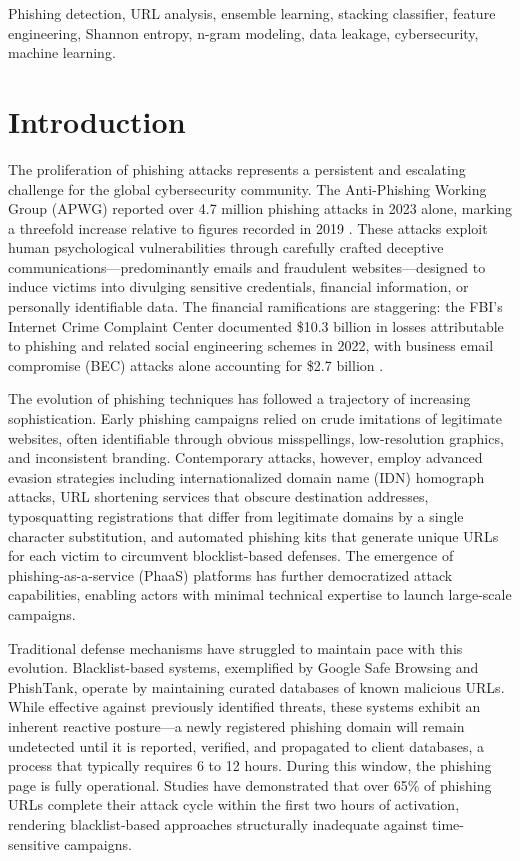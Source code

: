 \documentclass[conference]{IEEEtran}
\begin{document}
\begin{IEEEkeywords}
Phishing detection, URL analysis, ensemble learning, stacking classifier, feature engineering, Shannon entropy, n-gram modeling, data leakage, cybersecurity, machine learning.
\end{IEEEkeywords}

\section{Introduction}
The proliferation of phishing attacks represents a persistent and escalating challenge for the global cybersecurity community. The Anti-Phishing Working Group (APWG) reported over 4.7 million phishing attacks in 2023 alone, marking a threefold increase relative to figures recorded in 2019 \cite{apwg}. These attacks exploit human psychological vulnerabilities through carefully crafted deceptive communications---predominantly emails and fraudulent websites---designed to induce victims into divulging sensitive credentials, financial information, or personally identifiable data. The financial ramifications are staggering: the FBI's Internet Crime Complaint Center documented \$10.3 billion in losses attributable to phishing and related social engineering schemes in 2022, with business email compromise (BEC) attacks alone accounting for \$2.7 billion \cite{fbi}.

The evolution of phishing techniques has followed a trajectory of increasing sophistication. Early phishing campaigns relied on crude imitations of legitimate websites, often identifiable through obvious misspellings, low-resolution graphics, and inconsistent branding. Contemporary attacks, however, employ advanced evasion strategies including internationalized domain name (IDN) homograph attacks, URL shortening services that obscure destination addresses, typosquatting registrations that differ from legitimate domains by a single character substitution, and automated phishing kits that generate unique URLs for each victim to circumvent blocklist-based defenses. The emergence of phishing-as-a-service (PhaaS) platforms has further democratized attack capabilities, enabling actors with minimal technical expertise to launch large-scale campaigns.

Traditional defense mechanisms have struggled to maintain pace with this evolution. Blacklist-based systems, exemplified by Google Safe Browsing and PhishTank, operate by maintaining curated databases of known malicious URLs. While effective against previously identified threats, these systems exhibit an inherent reactive posture---a newly registered phishing domain will remain undetected until it is reported, verified, and propagated to client databases, a process that typically requires 6 to 12 hours. During this window, the phishing page is fully operational. Studies have demonstrated that over 65\% of phishing URLs complete their attack cycle within the first two hours of activation, rendering blacklist-based approaches structurally inadequate against time-sensitive campaigns.
\end{document}
